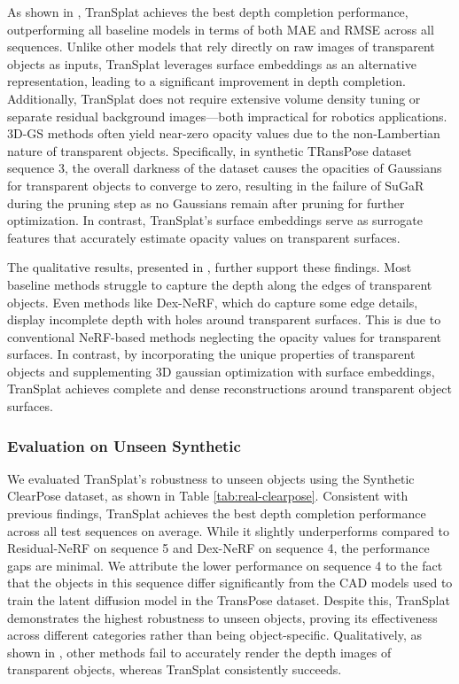 As shown in , TranSplat achieves the best depth completion performance, outperforming all baseline models in terms of both MAE and RMSE across all sequences. Unlike other models that rely directly on raw images of transparent objects as inputs, TranSplat leverages surface embeddings as an alternative representation, leading to a significant improvement in depth completion. Additionally, TranSplat does not require extensive volume density tuning or separate residual background images—both impractical for robotics applications. \ac{3D-GS} methods often yield near-zero opacity values due to the non-Lambertian nature of transparent objects. Specifically, in synthetic TRansPose dataset sequence 3, the overall darkness of the dataset causes the opacities of Gaussians for transparent objects to converge to zero, resulting in the failure of SuGaR during the pruning step as no Gaussians remain after pruning for further optimization. In contrast, TranSplat's surface embeddings serve as surrogate features that accurately estimate opacity values on transparent surfaces.




The qualitative results, presented in , further support these findings. Most baseline methods struggle to capture the depth along the edges of transparent objects. Even methods like Dex-NeRF, which do capture some edge details, display incomplete depth with holes around transparent surfaces. This is due to conventional \ac{NeRF}-based methods neglecting the opacity values for transparent surfaces. In contrast, by incorporating the unique properties of transparent objects and supplementing 3D gaussian optimization with surface embeddings, TranSplat achieves complete and dense reconstructions around transparent object surfaces.



\subsubsection{Evaluation on Unseen Synthetic}

We evaluated TranSplat's robustness to unseen objects using the Synthetic ClearPose dataset, as shown in Table \ref{tab:real-clearpose}. Consistent with previous findings, TranSplat achieves the best depth completion performance across all test sequences on average. While it slightly underperforms compared to Residual-NeRF on sequence 5 and Dex-NeRF on sequence 4, the performance gaps are minimal. We attribute the lower performance on sequence 4 to the fact that the objects in this sequence differ significantly from the CAD models used to train the latent diffusion model in the TransPose dataset. Despite this, TranSplat demonstrates the highest robustness to unseen objects, proving its effectiveness across different categories rather than being object-specific. Qualitatively, as shown in , other methods fail to accurately render the depth images of transparent objects, whereas TranSplat consistently succeeds.



